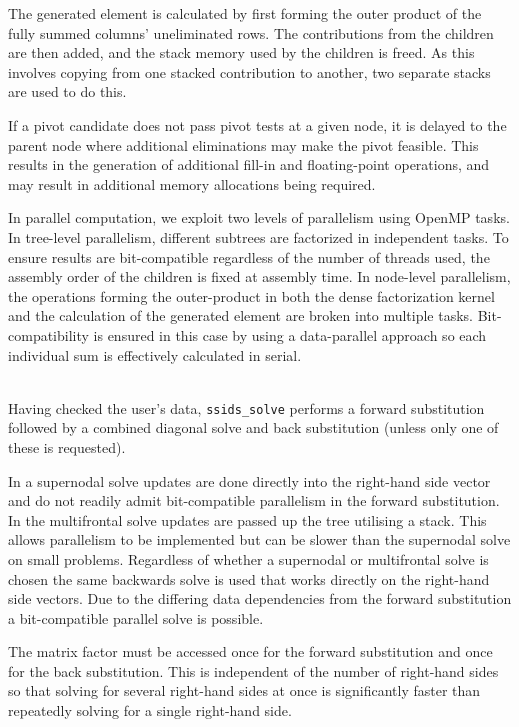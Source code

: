 \documentclass{spral}
\begin{document}
The generated element is calculated by first forming the outer product of the
fully summed columns' uneliminated rows. The contributions from the
children are then added, and the stack memory used by the children is freed.
As this involves copying from one stacked contribution to another,
two separate stacks are used to do this.

If a pivot candidate does not pass pivot tests at a given node, it is delayed
to the parent node where additional eliminations may make the pivot feasible.
This results in the generation of additional fill-in and floating-point
operations, and may result in additional memory allocations being required.

In parallel computation, we exploit two levels of parallelism using OpenMP
tasks.
In tree-level parallelism, different subtrees are factorized in independent
tasks. To ensure results are bit-compatible regardless of the number of threads
used, the assembly order of the children is fixed at assembly time.
In node-level parallelism, the operations forming the outer-product in both the
dense factorization kernel and the calculation of the generated element are
broken into multiple tasks. Bit-compatibility is ensured in this case by using
a data-parallel approach so each individual sum is effectively calculated in
serial.

\vspace{0.2in}
\\
Having checked the user's data, {\tt ssids\_solve} performs a forward
substitution followed by a combined diagonal solve and back substitution
(unless only one of these is requested).

In a supernodal solve updates are done directly into the right-hand side vector
and do not readily admit bit-compatible parallelism in the forward substitution.
In the multifrontal solve updates are passed up the tree utilising a stack. This
allows parallelism to be implemented but can be slower than the supernodal
solve on small problems.
Regardless of whether a supernodal or multifrontal solve is chosen the same
backwards solve is used that works directly on the right-hand side vectors. Due
to the differing data dependencies from the forward substitution a
bit-compatible parallel solve is possible.

The matrix factor must be accessed once for the
forward substitution and once for the back substitution. This is
independent of the number of right-hand sides so that solving for
several right-hand sides at once is significantly faster
than repeatedly solving for a single right-hand side.
\end{document}
